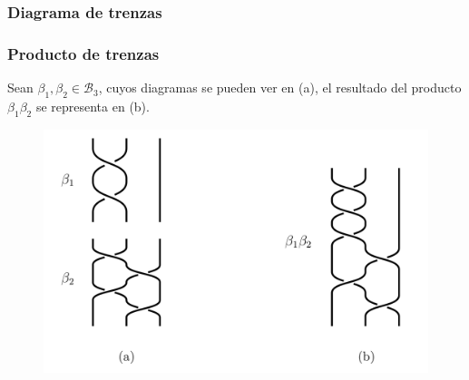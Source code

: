 \documentclass{beamer}
\begin{document}
\begin{frame}
\frametitle{Diagrama de trenzas}

\begin{figure}
\centering


\end{figure}

\end{frame}





\begin{frame}
\frametitle{Producto de trenzas}

Sean $\beta_1,\beta_2\in \mathcal{B}_3$, cuyos diagramas se pueden ver en (a), el resultado del producto $\beta_1\beta_2$ se representa en (b).
\begin{figure}
\includegraphics[scale=0.15]{imgs/imgs_trenzas/producto}
\end{figure}

\end{frame}
\end{document}
